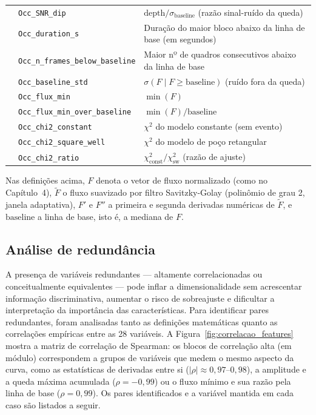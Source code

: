 \begin{table}[htbp]
\begin{tabular}{llp{7.1cm}}
& \texttt{Occ\_SNR\_dip} & $\text{depth}/\sigma_{\text{baseline}}$ (razão sinal-ruído da queda) \\
& \texttt{Occ\_duration\_s} & Duração do maior bloco abaixo da linha de base (em segundos) \\
& \texttt{Occ\_n\_frames\_below\_baseline} & Maior nº de quadros consecutivos abaixo da linha de base \\
& \texttt{Occ\_baseline\_std} & $\sigma(F \mid F \ge \text{baseline})$ (ruído fora da queda) \\
& \texttt{Occ\_flux\_min} & $\min(F)$ \\
& \texttt{Occ\_flux\_min\_over\_baseline} & $\min(F)/\text{baseline}$ \\
& \texttt{Occ\_chi2\_constant} & $\chi^2$ do modelo constante (sem evento) \\
& \texttt{Occ\_chi2\_square\_well} & $\chi^2$ do modelo de poço retangular \\
& \texttt{Occ\_chi2\_ratio} & $\chi^2_{\text{const}}/\chi^2_{\text{sw}}$ (razão de ajuste) \\
\hline
\end{tabular}
\end{table}

Nas definições acima, $F$ denota o vetor de fluxo normalizado (como no Capítulo~4), $\tilde{F}$ o fluxo suavizado por filtro Savitzky-Golay (polinômio de grau 2, janela adaptativa), $F'$ e $F''$ a primeira e segunda derivadas numéricas de $\tilde{F}$, e $\text{baseline}$ a linha de base, isto é, a mediana de $F$.

\subsection{Análise de redundância}

A presença de variáveis redundantes --- altamente correlacionadas ou conceitualmente equivalentes --- pode inflar a dimensionalidade sem acrescentar informação discriminativa, aumentar o risco de sobreajuste e dificultar a interpretação da importância das características. Para identificar pares redundantes, foram analisadas tanto as definições matemáticas quanto as correlações empíricas entre as 28 variáveis. A Figura~\ref{fig:correlacao_features} mostra a matriz de correlação de Spearman: os blocos de correlação alta (em módulo) correspondem a grupos de variáveis que medem o mesmo aspecto da curva, como as estatísticas de derivadas entre si ($|\rho| \approx 0{,}97$--$0{,}98$), a amplitude e a queda máxima acumulada ($\rho = -0{,}99$) ou o fluxo mínimo e sua razão pela linha de base ($\rho = 0{,}99$). Os pares identificados e a variável mantida em cada caso são listados a seguir.

